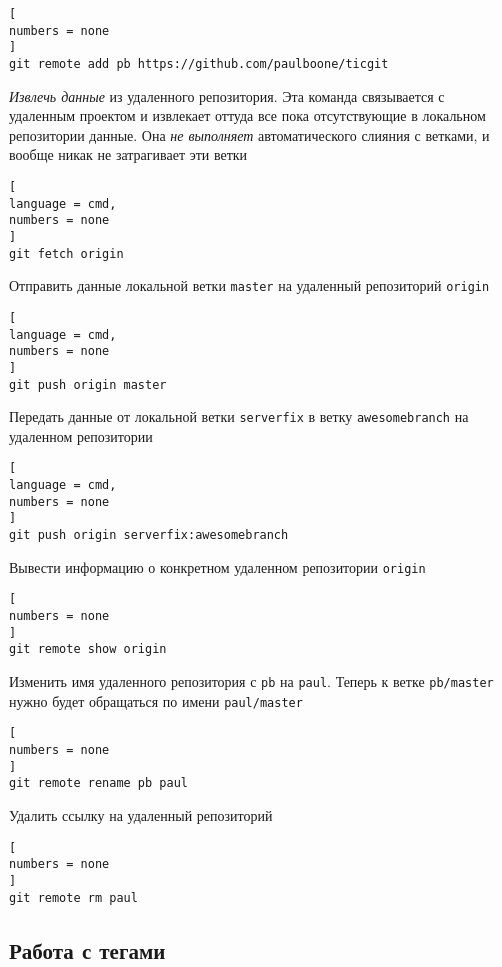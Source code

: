 \documentclass[%
	11pt,
	a4paper,
	utf8,
		]{article}
\begin{document}
\begin{lstlisting}[
numbers = none
]
git remote add pb https://github.com/paulboone/ticgit
\end{lstlisting}


\emph{Извлечь данные} из удаленного репозитория. Эта команда связывается с удаленным проектом и извлекает оттуда все пока отсутствующие в локальном репозитории данные. Она \emph{\color{red}не выполняет} автоматического слияния с ветками, и вообще никак не затрагивает эти ветки

\begin{lstlisting}[
language = cmd,
numbers = none
]
git fetch origin
\end{lstlisting}


Отправить данные локальной ветки \texttt{master} на удаленный репозиторий \texttt{origin}

\begin{lstlisting}[
language = cmd,
numbers = none
]
git push origin master
\end{lstlisting}


Передать данные от локальной ветки \texttt{serverfix} в ветку \texttt{awesomebranch} на удаленном репозитории

\begin{lstlisting}[
language = cmd,
numbers = none
]
git push origin serverfix:awesomebranch
\end{lstlisting}

Вывести информацию о конкретном удаленном репозитории \texttt{origin}

\begin{lstlisting}[
numbers = none
]
git remote show origin
\end{lstlisting}


Изменить имя удаленного репозитория с \texttt{pb} на \texttt{paul}. Теперь к ветке \texttt{pb/master} нужно будет обращаться по имени \texttt{paul/master}

\begin{lstlisting}[
numbers = none
]
git remote rename pb paul
\end{lstlisting}


Удалить ссылку на удаленный репозиторий

\begin{lstlisting}[
numbers = none
]
git remote rm paul
\end{lstlisting}


\subsection{Работа с тегами}
\end{document}
